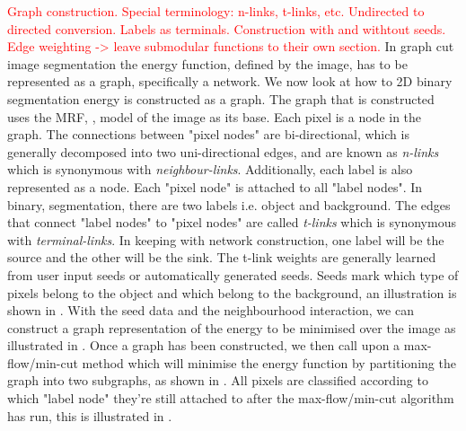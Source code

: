 \textcolor{red}{Graph construction. Special terminology: n-links, t-links, etc. Undirected to directed conversion. Labels as terminals. Construction with and withtout seeds. Edge weighting -> leave submodular functions to their own section.}
In graph cut image segmentation the energy function, defined by the image, has to be represented as a graph, specifically a network. We now look at how to 2D binary segmentation energy is constructed as a graph. The graph that is constructed uses the MRF, , model of the image as its base. Each pixel is a node in the graph. The connections between "pixel nodes" are bi-directional, which is generally decomposed into two uni-directional edges, and are known as \textit{n-links} which is synonymous with \textit{neighbour-links}. Additionally, each label is also represented as a node. Each "pixel node" is attached to all "label nodes". In binary, segmentation, there are two labels i.e. object and background. The edges that connect "label nodes" to "pixel nodes" are called \textit{t-links} which is synonymous with \textit{terminal-links}. In keeping with network construction, one label will be the source and the other will be the sink. The t-link weights are generally learned from user input seeds or automatically generated seeds. Seeds mark which type of pixels belong to the object and which belong to the background, an illustration is shown in . With the seed data and the neighbourhood interaction, we can construct a graph representation of the energy to be minimised over the image as illustrated in . Once a graph has been constructed, we then call upon a max-flow/min-cut method which will minimise the energy function by partitioning the graph into two subgraphs, as shown in . All pixels are classified according to which "label node" they're still attached to after the max-flow/min-cut algorithm has run, this is illustrated in .

